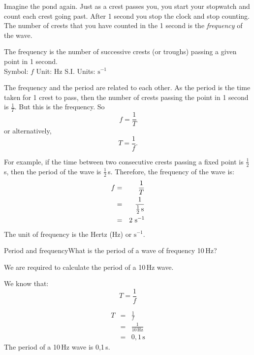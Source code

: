 \label{m38806*id319238}Imagine the pond again. Just as a crest passes you, you start your stopwatch and count each crest going past. After 1 second you stop the clock and stop counting. The number of crests that you have counted in the 1 second is the \textsl{frequency} of the wave.\par 

 { The frequency is the number of successive crests (or troughs) passing a given point in 1 second.\\
Symbol: $f$ \hspace{2cm} Unit: Hz\hspace{2cm} S.I. Units: $\text{s}^{-1}$ } 
        
The frequency and the period are related to each other. As the period is the time taken for 1 crest to pass, then the number of crests passing the point in 1 second is $\frac{1}{T}$. But this is the frequency. So
\begin{equation*}
\boxed{f=\frac{1}{T}}
\end{equation*}
or alternatively,
\begin{equation*}
\boxed{T=\frac{1}{f}}.
\end{equation*}

For example, if the time between two consecutive crests passing a fixed point is $\frac{1}{2}\,$s, then the period of the wave is $\frac{1}{2}\,$s. Therefore, the frequency of the wave is:
\begin{eqnarray*}
f&=&\frac{1}{T}\\
&=&\frac{1}{\frac{1}{2}\,\text{s}}\\
&=&2 \text{ s}^{-1}
\end{eqnarray*}
The unit of frequency is the Hertz (Hz) or $\text{s}^{-1}$.
\pagebreak

\begin{wex}{Period and frequency}{What is the period of a wave of frequency 10\,Hz?}{
We are required to calculate the period of a 10\,Hz wave.

We know that:
\begin{equation}
T=\frac{1}{f}\nonumber 
\end{equation}

\begin{eqnarray*}
T&=&\frac{1}{f}\\
&=&\frac{1}{10\,\text{Hz}}\\
&=&0,1\,\text{s}
\end{eqnarray*}
The period of a 10\,Hz wave is 0,1\,s.}
\end{wex}

